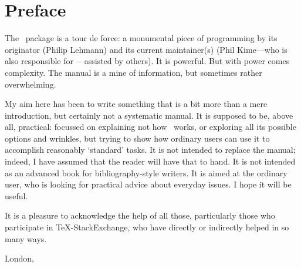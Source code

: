 
\maketitle

\tableofcontents

\chapter{Preface}

The \biblatex\ package is a tour de force: a monumental piece of
programming by its originator (Philip Lehmann) and its current
maintainer(s) (Phil Kime---who is also responsible for
---assisted by others). It is powerful. But with power
comes complexity. The manual is a mine of information, but sometimes
rather overwhelming.

My aim here has been to write something that is a bit more than a mere
introduction, but certainly not a systematic manual. It is supposed to
be, above all, practical: focussed on explaining not how \biblatex\
works, or exploring all its possible options and wrinkles, but trying
to show how ordinary users can use it to accomplish reasonably
`standard' tasks. It is not intended to replace the manual; indeed, I
have assumed that the reader will have that to hand. It is not
intended as an advanced book for bibliography-style writers. It is
aimed at the ordinary user, who is looking for practical advice about
everyday issues. I hope it will be useful.

It is a pleasure to acknowledge the help of all those, particularly
those who participate in \TeX-StackExchange, who have directly or
indirectly helped in so many ways.

\hfill{}

\hfill{London, \prefacedate}

